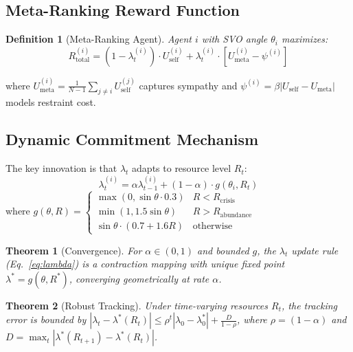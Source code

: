 \documentclass{article}
\newtheorem{theorem}{Theorem}
\newtheorem{definition}{Definition}
\begin{document}
\subsection{Meta-Ranking Reward Function}

\begin{definition}[Meta-Ranking Agent]
Agent $i$ with SVO angle $\theta_i$ maximizes:
\begin{equation}
R_{\text{total}}^{(i)} = (1 - \lambda_t^{(i)}) \cdot U_{\text{self}}^{(i)}
  + \lambda_t^{(i)} \cdot \left[ U_{\text{meta}}^{(i)} - \psi^{(i)} \right]
\label{eq:reward}
\end{equation}
\end{definition}

\noindent where $U_{\text{meta}}^{(i)} = \frac{1}{N-1}\sum_{j \neq i} U_{\text{self}}^{(j)}$ captures sympathy and $\psi^{(i)} = \beta |U_{\text{self}} - U_{\text{meta}}|$ models restraint cost.

\subsection{Dynamic Commitment Mechanism}

The key innovation is that $\lambda_t$ adapts to resource level $R_t$:
\begin{equation}
\lambda_t^{(i)} = \alpha \lambda_{t-1}^{(i)} + (1-\alpha) \cdot g(\theta_i, R_t)
\label{eq:lambda}
\end{equation}
where $g(\theta, R) = \begin{cases}
\max(0, \sin\theta \cdot 0.3) & R < R_{\text{crisis}} \\
\min(1, 1.5\sin\theta) & R > R_{\text{abundance}} \\
\sin\theta \cdot (0.7 + 1.6R) & \text{otherwise}
\end{cases}$

\begin{theorem}[Convergence]
\label{thm:convergence}
For $\alpha \in (0,1)$ and bounded $g$, the $\lambda_t$ update rule (Eq.~\ref{eq:lambda}) is a contraction mapping with unique fixed point $\lambda^* = g(\theta, R^*)$, converging geometrically at rate $\alpha$.
\end{theorem}

\begin{theorem}[Robust Tracking]
\label{thm:tracking}
Under time-varying resources $R_t$, the tracking error is bounded by $|\lambda_t - \lambda^*(R_t)| \le \rho^t |\lambda_0 - \lambda^*_0| + \frac{D}{1-\rho}$, where $\rho = (1-\alpha)$ and $D = \max_t |\lambda^*(R_{t+1}) - \lambda^*(R_t)|$.
\end{theorem}
\end{document}
